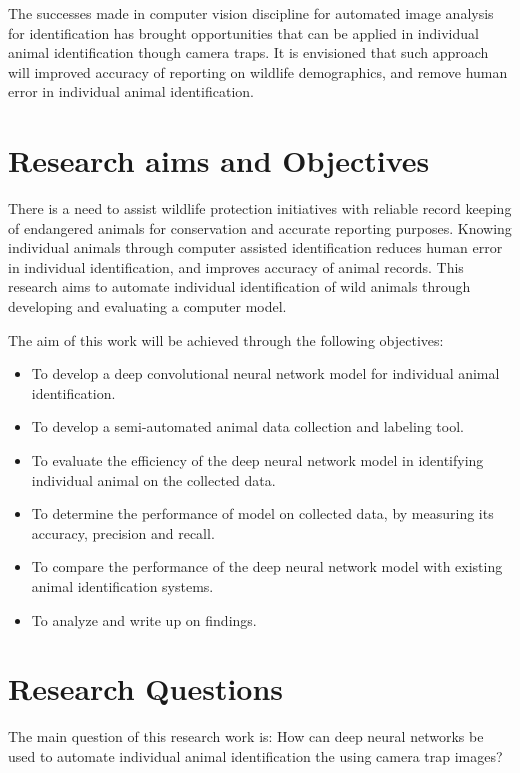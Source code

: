 The successes made in computer vision discipline for automated image analysis for identification has brought opportunities that can be applied in individual animal identification though camera traps. It is envisioned that such approach will improved accuracy of reporting on wildlife demographics, and remove human error in individual animal identification. 

\section{Research  aims  and Objectives}
There is a need to assist wildlife protection initiatives with reliable record keeping of endangered animals for conservation and accurate reporting purposes. Knowing individual animals through computer assisted identification reduces human error in individual identification, and improves accuracy of animal records. This research aims to automate individual identification of wild animals through developing and evaluating a computer model. 

The aim of this work will be achieved through the following objectives: 

\begin{itemize}

    \item To develop a deep convolutional neural network model for individual animal identification.
    \item To develop a semi-automated animal data collection and labeling tool.
    \item To evaluate the efficiency of the deep neural network model in identifying individual animal on the collected data.
    \item To determine the performance of model on collected data, by measuring its accuracy, precision and recall. 
    \item To compare the performance of the deep neural network model with existing animal identification systems. 
    \item To analyze and write up on findings.  
\end{itemize}
\section{Research Questions}
The main question of this research work is: 
How can deep neural networks be used to automate individual animal identification the using camera trap images?

